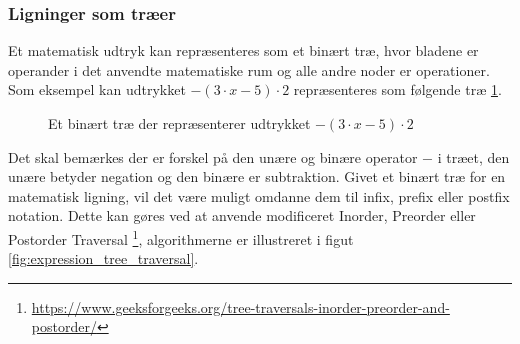 \documentclass{article}
\begin{document}
 

\subsubsection{Ligninger som træer}
Et matematisk udtryk kan repræsenteres som et binært træ, hvor bladene er operander i det anvendte matematiske rum og alle andre noder er operationer. Som eksempel kan udtrykket $-(3 \cdot x - 5) \cdot 2$ repræsenteres som følgende træ \ref{fig:expression_tree}. 


\begin{figure}[H]
\centering
{}
\caption{Et binært træ der repræsenterer udtrykket $-(3 \cdot x - 5) \cdot 2$}
\label{fig:expression_tree}
\end{figure}
Det skal bemærkes der er forskel på den unære og binære operator $-$ i træet, den unære betyder negation og den binære er subtraktion. Givet et binært træ for en matematisk ligning, vil det være muligt omdanne dem til infix, prefix eller postfix notation. Dette kan gøres ved at anvende modificeret Inorder, Preorder eller Postorder Traversal \footnote{\url{https://www.geeksforgeeks.org/tree-traversals-inorder-preorder-and-postorder/}}, algorithmerne er illustreret i figut \ref{fig:expression_tree_traversal}.
\end{document}

